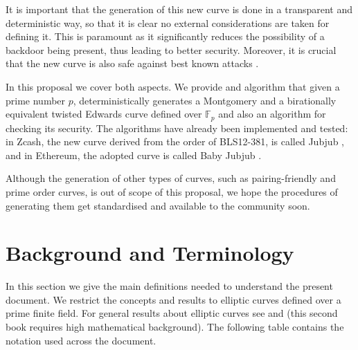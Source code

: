 \documentclass{article}
\newcommand{\Fp}{\ensuremath{\mathbb{F}_p}}
\theoremstyle{definition}
\theoremstyle{remark}
\begin{document}
\begin{spacing}{1.2}
\begin{multicols}{2}
It is important that the generation of this new curve is done in a transparent and deterministic way, so that it is clear no external considerations are taken for defining it. This is paramount as it significantly reduces the possibility of a backdoor being present, thus leading to better security. Moreover, it is crucial that the new curve is also safe against best known attacks \cite{seroussi}. 

In this proposal we cover both aspects. We provide and algorithm that given a prime number $p$, deterministically generates a Montgomery and a birationally equivalent twisted Edwards curve defined over $\Fp$ and also an algorithm for checking its security. The algorithms have already been implemented and tested: in Zcash, the new curve derived from the order of BLS12-381, is called Jubjub \cite{github:zcash:sapling}, and in Ethereum, the adopted curve is called Baby Jubjub \cite{github:barry:babyjubjub}.

Although the generation of other types of curves, such as pairing-friendly and prime order curves, %
is out of scope of this proposal, we hope the procedures of generating them get standardised and available to the community soon. 

\section{Background and Terminology}
	
In this section we give the main definitions needed to understand the present document. We restrict the concepts and results to elliptic curves defined over a prime finite field. For general results about elliptic curves see \cite{washington} and \cite{silverman} (this second book requires high mathematical background). The following table contains the notation used across the document. 


\end{multicols}
\end{spacing}
\end{document}
